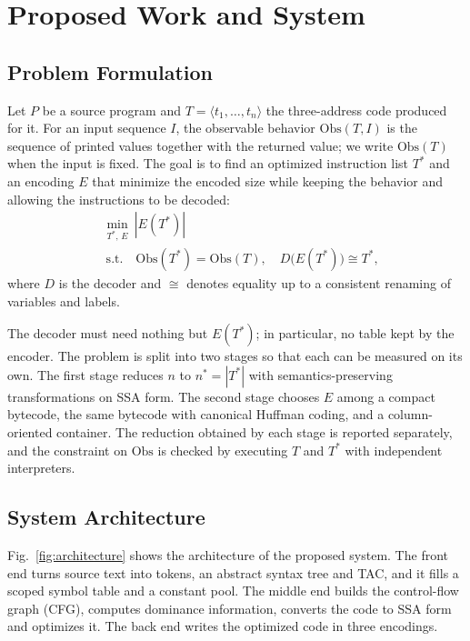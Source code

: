 \documentclass{ieeeaccess}
\begin{document}
\section{Proposed Work and System}
\label{sec:proposed}
\subsection{Problem Formulation}
Let $P$ be a source program and $T=\langle t_1,\dots,t_n\rangle$ the three-address code produced for it. For an input sequence $I$, the observable behavior $\mathrm{Obs}(T,I)$ is the sequence of printed values together with the returned value; we write $\mathrm{Obs}(T)$ when the input is fixed. The goal is to find an optimized instruction list $T^\ast$ and an encoding $E$ that minimize the encoded size while keeping the behavior and allowing the instructions to be decoded:
\begin{equation}
\begin{aligned}
&\min_{T^\ast,\,E}\ |E(T^\ast)|\\
&\ \text{s.t.}\quad \mathrm{Obs}(T^\ast)=\mathrm{Obs}(T),\quad D\big(E(T^\ast)\big)\cong T^\ast,
\end{aligned}
\label{eq:objective}
\end{equation}
where $D$ is the decoder and $\cong$ denotes equality up to a consistent renaming of variables and labels.

The decoder must need nothing but $E(T^\ast)$; in particular, no table kept by the encoder. The problem is split into two stages so that each can be measured on its own. The first stage reduces $n$ to $n^\ast=|T^\ast|$ with semantics-preserving transformations on SSA form. The second stage chooses $E$ among a compact bytecode, the same bytecode with canonical Huffman coding, and a column-oriented container. The reduction obtained by each stage is reported separately, and the constraint on $\mathrm{Obs}$ is checked by executing $T$ and $T^\ast$ with independent interpreters.

\subsection{System Architecture}
Fig.~\ref{fig:architecture} shows the architecture of the proposed system. The front end turns source text into tokens, an abstract syntax tree and TAC, and it fills a scoped symbol table and a constant pool. The middle end builds the control-flow graph (CFG), computes dominance information, converts the code to SSA form and optimizes it. The back end writes the optimized code in three encodings.
\end{document}
